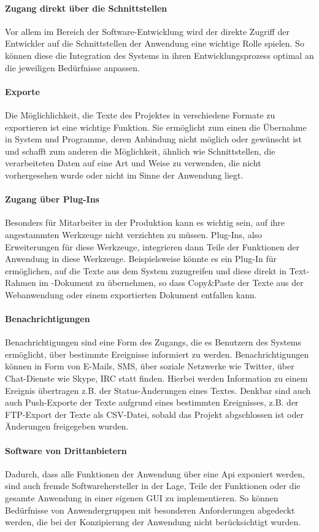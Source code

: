 \paragraph{Zugang direkt über die Schnittstellen} Vor allem im Bereich der Software-Entwicklung wird der direkte Zugriff der Entwickler auf die Schnittstellen der Anwendung eine wichtige Rolle spielen. So können diese die Integration des Systems in ihren Entwicklungsprozess optimal an die jeweiligen Bedürfnisse anpassen.

\paragraph{Exporte} Die Möglichlichkeit, die Texte des Projektes in verschiedene Formate zu exportieren ist eine wichtige Funktion. Sie ermöglicht zum einen die Übernahme in System und Programme, deren Anbindung nicht möglich oder gewünscht ist und schafft zum anderen die Möglichkeit, ähnlich wie Schnittstellen, die verarbeiteten Daten auf eine Art und Weise zu verwenden, die nicht vorhergesehen wurde oder nicht im Sinne der Anwendung liegt.

\paragraph{Zugang über Plug-Ins} Besonders für Mitarbeiter in der Produktion kann es wichtig sein, auf ihre angestammten Werkzeuge nicht verzichten zu müssen. Plug-Ins, also Erweiterungen für diese Werkzeuge, integrieren dann Teile der Funktionen der Anwendung in diese Werkzeuge. Beispielsweise könnte es ein Plug-In für  ermöglichen, auf die Texte aus dem System zuzugreifen und diese direkt in Text-Rahmen im -Dokument zu übernehmen, so dass Copy\&Paste der Texte aus der Webanwendung oder einem exportierten Dokument entfallen kann.

\paragraph{Benachrichtigungen} Benachrichtigungen sind eine Form des Zugangs, die es Benutzern des Systems ermöglicht, über bestimmte Ereignisse informiert zu werden. Benachrichtigungen können in Form von E-Mails, SMS, über soziale Netzwerke wie Twitter, über Chat-Dienste wie Skype, IRC statt finden. Hierbei werden Information zu einem Ereignis übertragen z.B. der Status-Änderungen eines Textes. Denkbar sind auch auch Push-Exporte der Texte aufgrund eines bestimmten Ereignisses, z.B. der FTP-Export der Texte als CSV-Datei, sobald das Projekt abgschlossen ist oder Änderungen freigegeben wurden.

\paragraph{Software von Drittanbietern} Dadurch, dass alle Funktionen der Anwendung über eine Api exponiert werden, sind auch fremde Softwarehersteller in der Lage, Teile der Funktionen oder die gesamte Anwendung in einer eigenen GUI zu implementieren. So können Bedürfnisse von Anwendergruppen mit besonderen Anforderungen abgedeckt werden, die bei der Konzipierung der Anwendung nicht berücksichtigt wurden.
